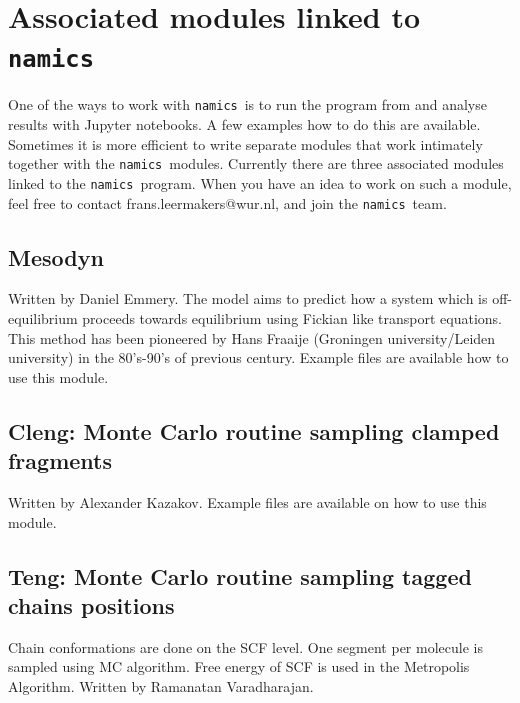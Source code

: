 \documentclass{article}
\newcommand{\namics}{{\tt namics}}
\begin{document}
\section{Associated modules linked to \namics\ }

One of the ways to work with \namics\ is to run the program from and analyse results with Jupyter notebooks. A few examples how to do this are available. 
Sometimes it is more efficient to write separate modules that work intimately together with the \namics\ modules. Currently there are three associated modules linked to the \namics\ program. When you have an idea to work on such a module, feel free to contact frans.leermakers@wur.nl, and join the \namics\ team. 

\subsection {Mesodyn} Written by Daniel Emmery. The model aims to predict how a system which is off-equilibrium proceeds towards equilibrium using Fickian like transport equations. This method has been pioneered by Hans Fraaije (Groningen university/Leiden university) in the 80's-90's of previous century. Example files are available how to use this module. 

\subsection {Cleng: Monte Carlo routine sampling clamped fragments}  Written by Alexander Kazakov. Example files are available on how to use this module.

\subsection {Teng: Monte Carlo routine sampling tagged chains positions} Chain conformations are done on the SCF level. One segment per molecule is sampled using MC algorithm. Free energy of SCF is used in the Metropolis Algorithm.  Written by Ramanatan Varadharajan.
\end{document}
